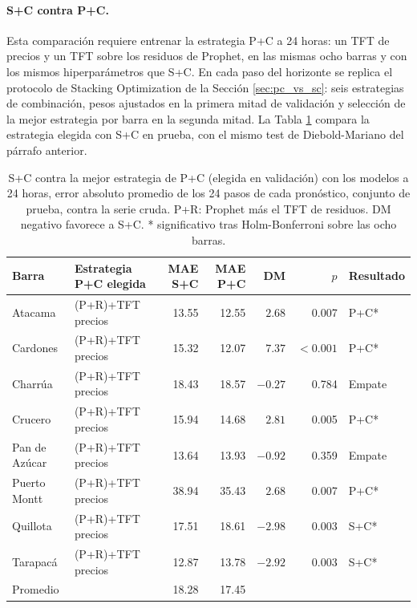 \paragraph{S+C contra P+C.} Esta comparación requiere entrenar la estrategia P+C a 24 horas: un TFT de precios y un TFT sobre los residuos de Prophet, en las mismas ocho barras y con los mismos hiperparámetros que S+C. En cada paso del horizonte se replica el protocolo de Stacking Optimization de la Sección \ref{sec:pc_vs_sc}: seis estrategias de combinación, pesos ajustados en la primera mitad de validación y selección de la mejor estrategia por barra en la segunda mitad. La Tabla \ref{tab:h24_pc_sc} compara la estrategia elegida con S+C en prueba, con el mismo test de Diebold-Mariano del párrafo anterior.

\begin{table}[htbp]
    \centering
    \small
    \setlength{\tabcolsep}{4pt}
    \begin{tabular}{llrrrrl}
        \toprule
        Barra & Estrategia P+C elegida & MAE S+C & MAE P+C & DM & $p$ & Resultado \\
        \midrule
        Atacama       & (P+R)+TFT precios & 13.55 & 12.55 & $2.68$   & 0.007 & P+C* \\
        Cardones      & (P+R)+TFT precios & 15.32 & 12.07 & $7.37$   & $<0.001$ & P+C* \\
        Charrúa       & (P+R)+TFT precios & 18.43 & 18.57 & $-0.27$  & 0.784 & Empate \\
        Crucero       & (P+R)+TFT precios & 15.94 & 14.68 & $2.81$   & 0.005 & P+C* \\
        Pan de Azúcar & (P+R)+TFT precios & 13.64 & 13.93 & $-0.92$  & 0.359 & Empate \\
        Puerto Montt  & (P+R)+TFT precios & 38.94 & 35.43 & $2.68$   & 0.007 & P+C* \\
        Quillota      & (P+R)+TFT precios & 17.51 & 18.61 & $-2.98$  & 0.003 & S+C* \\
        Tarapacá      & (P+R)+TFT precios & 12.87 & 13.78 & $-2.92$  & 0.003 & S+C* \\
        \midrule
        Promedio      &                   & 18.28 & 17.45 &         &       &        \\
        \bottomrule
    \end{tabular}
    \vspace{0.2cm}
    \caption{S+C contra la mejor estrategia de P+C (elegida en validación) con los modelos a 24 horas, error absoluto promedio de los 24 pasos de cada pronóstico, conjunto de prueba, contra la serie cruda. P+R: Prophet más el TFT de residuos. DM negativo favorece a S+C. * significativo tras Holm-Bonferroni sobre las ocho barras.}
    \label{tab:h24_pc_sc}
\end{table}

